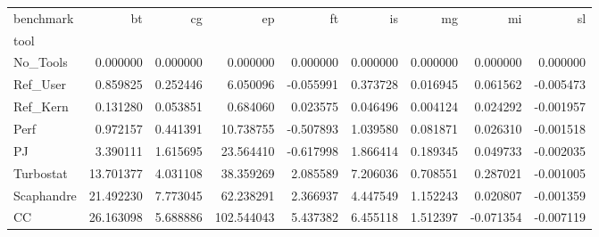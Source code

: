 \begin{tabular}{lrrrrrrrr}
\toprule
benchmark & bt & cg & ep & ft & is & mg & mi & sl \\
tool &  &  &  &  &  &  &  &  \\
\midrule
No_Tools & 0.000000 & 0.000000 & 0.000000 & 0.000000 & 0.000000 & 0.000000 & 0.000000 & 0.000000 \\
Ref_User & 0.859825 & 0.252446 & 6.050096 & -0.055991 & 0.373728 & 0.016945 & 0.061562 & -0.005473 \\
Ref_Kern & 0.131280 & 0.053851 & 0.684060 & 0.023575 & 0.046496 & 0.004124 & 0.024292 & -0.001957 \\
Perf & 0.972157 & 0.441391 & 10.738755 & -0.507893 & 1.039580 & 0.081871 & 0.026310 & -0.001518 \\
PJ & 3.390111 & 1.615695 & 23.564410 & -0.617998 & 1.866414 & 0.189345 & 0.049733 & -0.002035 \\
Turbostat & 13.701377 & 4.031108 & 38.359269 & 2.085589 & 7.206036 & 0.708551 & 0.287021 & -0.001005 \\
Scaphandre & 21.492230 & 7.773045 & 62.238291 & 2.366937 & 4.447549 & 1.152243 & 0.020807 & -0.001359 \\
CC & 26.163098 & 5.688886 & 102.544043 & 5.437382 & 6.455118 & 1.512397 & -0.071354 & -0.007119 \\
\bottomrule
\end{tabular}
